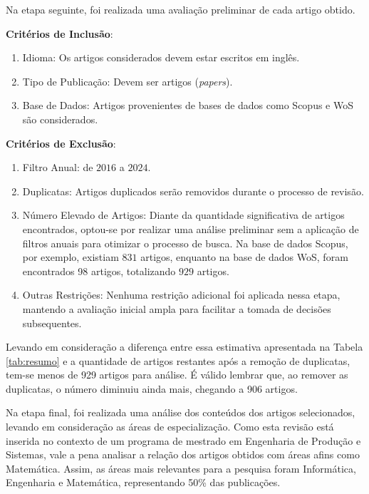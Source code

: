 Na etapa seguinte, foi realizada uma avaliação preliminar de cada artigo obtido.

\noindent\textbf{Critérios de Inclusão}:

\begin{enumerate}
	\item Idioma: Os artigos considerados devem estar escritos em inglês.
	\item Tipo de Publicação: Devem ser artigos (\textit{papers}).
	\item Base de Dados: Artigos provenientes de bases de dados como Scopus e WoS são considerados.
\end{enumerate}

\noindent\textbf{Critérios de Exclusão}:

\begin{enumerate}
	\item Filtro Anual: de $2016$ a $2024$.
	\item Duplicatas: Artigos duplicados serão removidos durante o processo de revisão.
	\item Número Elevado de Artigos: Diante da quantidade significativa de artigos encontrados, optou-se por realizar uma análise preliminar sem a aplicação de filtros anuais para otimizar o processo de busca. Na base de dados Scopus, por exemplo, existiam $831$ artigos, enquanto na base de dados WoS, foram encontrados 98 artigos, totalizando $929$ artigos.
	\item Outras Restrições: Nenhuma restrição adicional foi aplicada nessa etapa, mantendo a avaliação inicial ampla para facilitar a tomada de decisões subsequentes.
\end{enumerate}


Levando em consideração a diferença entre essa estimativa apresentada na Tabela \ref{tab:resumo} e a quantidade de artigos restantes após a remoção de duplicatas, tem-se menos de 929 artigos para análise. É válido lembrar que, ao remover as duplicatas, o número diminuiu ainda mais, chegando a 906 artigos.

Na etapa final, foi realizada uma análise dos conteúdos dos artigos selecionados, levando em consideração as áreas de especialização. Como esta revisão está inserida no contexto de um programa de mestrado em Engenharia de Produção e Sistemas, vale a pena analisar a relação dos artigos obtidos com áreas afins como Matemática. Assim, as áreas mais relevantes para a pesquisa foram Informática, Engenharia e Matemática, representando 50\% das publicações. 


